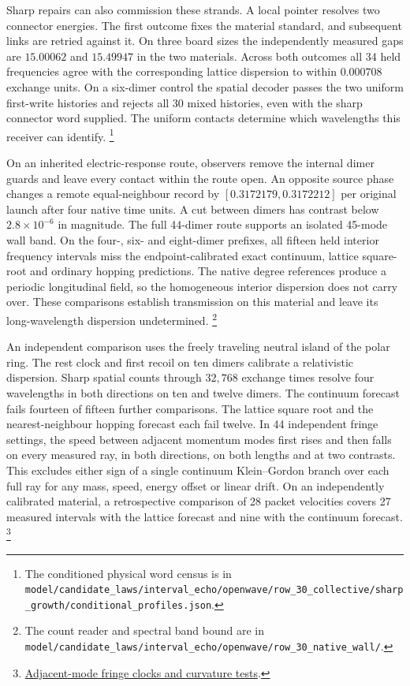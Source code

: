 \documentclass[11pt]{article}
\theoremstyle{definition}
\theoremstyle{remark}
\theoremstyle{plain}
\begin{document}
Sharp repairs can also commission these strands. A local pointer resolves
two connector energies. The first outcome fixes the material standard,
and subsequent links are retried against it. On three board sizes the
independently measured gaps are $15.00062$ and $15.49947$ in the two
materials. Across both outcomes all 34 held frequencies agree with the
corresponding lattice dispersion to within $0.000708$ exchange units.
On a six-dimer control the spatial decoder passes the two uniform
first-write histories and rejects all 30 mixed histories, even
with the sharp connector word supplied. The uniform contacts determine
which wavelengths this receiver can identify.%
\footnote{The conditioned physical word census is in
\nolinkurl{model/candidate_laws/interval_echo/openwave/row_30_collective/sharp_growth/conditional_profiles.json}.}

On an inherited electric-response route, observers remove the internal
dimer guards and leave every contact within the route open. An opposite
source phase changes a remote equal-neighbour record by
\([0.3172179,0.3172212]\) per original launch after four native time
units. A cut between dimers has contrast below \(2.8\times 10^{-6}\)
in magnitude. The full 44-dimer route supports an isolated 45-mode
wall band. On the four-, six- and eight-dimer prefixes, all fifteen
held interior frequency intervals miss the endpoint-calibrated exact
continuum, lattice square-root and ordinary hopping predictions.
The native degree references produce a periodic longitudinal field,
so the homogeneous interior dispersion does not carry over. These
comparisons establish transmission on this material and leave its
long-wavelength dispersion undetermined.%
\footnote{The count reader and spectral band bound are in
\nolinkurl{model/candidate_laws/interval_echo/openwave/row_30_native_wall/}.}

An independent comparison uses the freely traveling neutral island
of the polar ring. The rest clock and first recoil on ten dimers
calibrate a relativistic dispersion. Sharp spatial counts through
$32{,}768$ exchange times resolve four wavelengths in both directions
on ten and twelve dimers. The continuum forecast fails fourteen of
fifteen further comparisons. The lattice square root and the
nearest-neighbour hopping forecast each fail twelve. In 44 independent
fringe settings, the speed between adjacent momentum modes first rises
and then falls on every measured ray, in both directions, on both lengths
and at two contrasts. This excludes either sign of a single continuum
Klein--Gordon branch over each full ray for any mass, speed, energy offset
or linear drift. On an independently calibrated material, a retrospective
comparison of 28 packet velocities covers 27 measured intervals with the
lattice forecast and nine with the continuum forecast.%
\footnote{\href{https://github.com/FloatingPragma/observer-patch-holography/tree/main/model/candidate_laws/interval_echo/openwave/row_30_collective/beat_speed}{Adjacent-mode fringe clocks and curvature tests}.}
\end{document}
